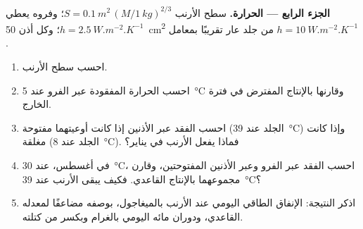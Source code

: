 \begin{problem}
\medskip
\noindent\textbf{الجزء الرابع --- الحرارة.}
سطح الأرنب $S = \qty{0.1}{m^2}\,(M/\qty{1}{kg})^{2/3}$؛ وفروه يعطي
$h = \qty{2.5}{W.m^{-2}.K^{-1}}$؛ وكل أذن \qty{50}{cm^2} من جلد
عار تقريبًا بمعامل $h = \qty{10}{W.m^{-2}.K^{-1}}$.
\begin{enumerate}[resume]
  \item احسب سطح الأرنب.
  \item احسب الحرارة المفقودة عبر الفرو عند \qty{5}{\celsius}
        وقارنها بالإنتاج المفترض في فترة الخارج.
  \item احسب الفقد عبر الأذنين إذا كانت أوعيتهما مفتوحة (الجلد عند
        \qty{39}{\celsius}) وإذا كانت مغلقة (الجلد عند
        \qty{8}{\celsius}). فماذا يفعل الأرنب في يناير؟
  \item في أغسطس، عند \qty{30}{\celsius}، احسب الفقد عبر الفرو وعبر
        الأذنين المفتوحتين، وقارن مجموعهما بالإنتاج القاعدي. فكيف
        يبقى الأرنب عند \qty{39}{\celsius}؟
  \item اذكر النتيجة: الإنفاق الطاقي اليومي عند الأرنب بالميغاجول،
        بوصفه مضاعفًا لمعدله القاعدي، ودوران مائه اليومي بالغرام
        وبكسر من كتلته.
\end{enumerate}
\end{problem}
